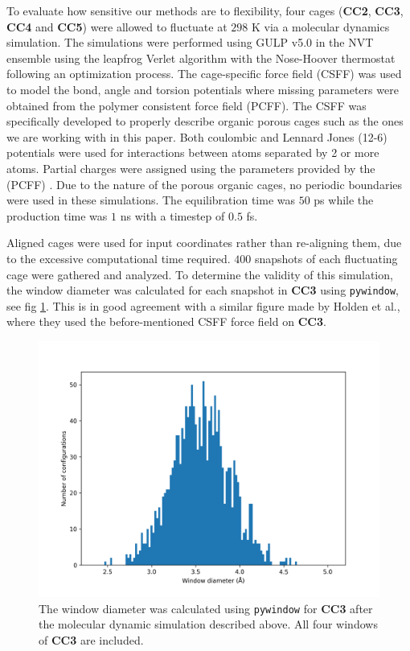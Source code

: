 \documentclass[journal=jacsat,manuscript=article]{achemso}
\begin{document}
{\color{red}To evaluate how sensitive our methods are to flexibility, four cages (\textbf{CC2}, \textbf{CC3}, \textbf{CC4} and \textbf{CC5}) were allowed to fluctuate at $298$ K via a molecular dynamics simulation. The simulations were performed using GULP v5.0 \cite{julian2003gulp} in the NVT ensemble using the leapfrog Verlet algorithm with the Nose-Hoover thermostat following an optimization process. The cage-specific force field (CSFF) was used to model the bond, angle and torsion potentials \cite{holden2012bespoke} where missing parameters were obtained from the polymer consistent force field (PCFF). The CSFF was specifically developed to properly describe organic porous cages such as the ones we are working with in this paper. Both coulombic and Lennard Jones (12-6) potentials were used for interactions between atoms separated by 2 or more atoms. Partial charges were assigned using the parameters provided by the (PCFF) \cite{sun1998compass}\cite{holden2012bespoke} . Due to the nature of the porous organic cages, no periodic boundaries were used in these simulations. The equilibration time was $50$ ps while the production time was $1$ ns with a timestep of $0.5$ fs.

Aligned cages were used for input coordinates rather than re-aligning them, due to the excessive computational time required. $400$ snapshots of each fluctuating cage were gathered and analyzed. To determine the validity of this simulation, the window diameter was calculated for each snapshot in \textbf{CC3} using \texttt{pywindow}, see fig \ref{fig:window_diameter_hist}. This is in good agreement with a similar figure made by Holden et al.\cite{holden2012bespoke}, where they used the before-mentioned CSFF force field on \textbf{CC3}.

\begin{figure}
\centering
	\includegraphics[width=0.65\columnwidth]{../cc3_histogram.png}
	\caption{\color{red}The window diameter was calculated using \texttt{pywindow} for \textbf{CC3} after the molecular dynamic simulation described above. All four windows of \textbf{CC3} are included.
	} \label{fig:window_diameter_hist}
\end{figure}

}
\end{document}

